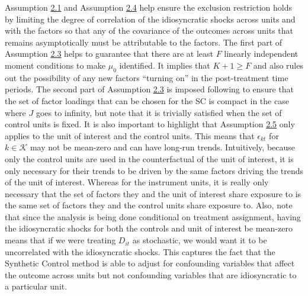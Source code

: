 \documentclass{article}
\begin{document}
\par 
Assumption \hyperref[A2]{2.1} and Assumption \hyperref[A2]{2.4} help ensure the exclusion restriction holds by limiting the degree of correlation of the idiosyncratic shocks across units and with the factors so that any of the covariance of the outcomes across units that remains asymptotically must be attributable to the factors. The first part of Assumption \hyperref[A2]{2.3} helps to guarantee that there are at least $F$ linearly independent moment conditions to make $\mu_0$ identified. It implies that $K + 1 \geq F$ and also rules out the possibility of any new factors “turning on” in the post-treatment time periods. The second part of Assumption \hyperref[A2]{2.3} is imposed following  \cite{LargeSampleProperties} to ensure that the set of factor loadings that can be chosen for the SC is compact in the case where $J$ goes to infinity, but note that it is trivially satisfied when the set of control units is fixed. It is also important to highlight that Assumption \hyperref[A2]{2.5} only applies to the unit of interest and the control units. This means that $\epsilon_{kt}$ for $k \in \mathcal{K}$ may not be mean-zero and can have long-run trends. Intuitively, because only the control units are used in the counterfactual of the unit of interest, it is only necessary for their trends to be driven by the same factors driving the trends of the unit of interest. Whereas for the instrument units, it is really only necessary that the set of factors they and the unit of interest share exposure to is the same set of factors they and the control units share exposure to. Also, note that since the analysis is being done conditional on treatment assignment, having the idiosyncratic shocks for both the controls and unit of interest be mean-zero means that if we were treating $D_{it}$ as stochastic, we would want it to be uncorrelated with the idiosyncratic shocks. This captures the fact that the Synthetic Control method is able to adjust for confounding variables that affect the outcome across units but not confounding variables that are idiosyncratic to a particular unit.
\par 
\end{document}
